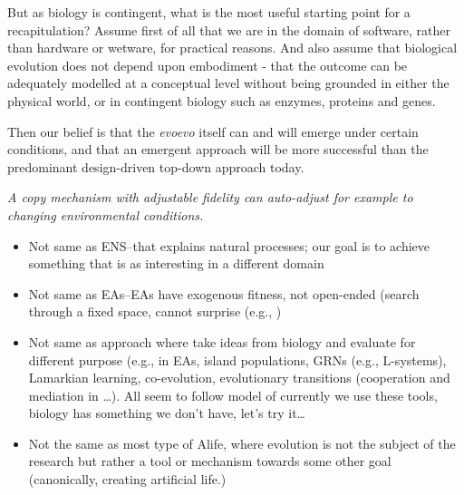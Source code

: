 But as biology is contingent, what is the most useful starting point for a recapitulation? Assume first of all that we are in the domain of software, rather than hardware or wetware, for practical reasons. And also assume that biological evolution does not depend upon embodiment - that the outcome can be adequately modelled at a conceptual level without being grounded in either the physical world, or in contingent biology such as enzymes, proteins and genes.

Then our belief is that the \emph{\gls{evoevo}} itself can and will emerge under certain conditions, and that an emergent approach will be more successful than the predominant design-driven top-down approach today.


\emph{A copy mechanism with adjustable fidelity can auto-adjust for example to changing environmental conditions.}

\begin{itemize}
	\item
	      Not same as ENS--that explains natural processes; our goal is to achieve something that is as interesting in a different domain
	\item 
	      Not same as EAs--EAs have exogenous fitness, not open-ended (search through a fixed space, cannot surprise (e.g., \parencite{Nellis2014})
	\item  
	      Not same as approach where take ideas from biology and evaluate for different purpose (e.g., in EAs, island populations, GRNs (e.g., L-systems), Lamarkian learning, co-evolution, evolutionary transitions (cooperation and mediation in \parencite{Defaweux:2005fk}\ldots{}). All seem to follow model of currently we use these tools, biology has something we don't have, let's try it\ldots{}
	\item
	      Not the same as most type of Alife, where evolution is not the subject of the research but rather a tool or mechanism towards some other goal (canonically, creating artificial life.)
\end{itemize}

